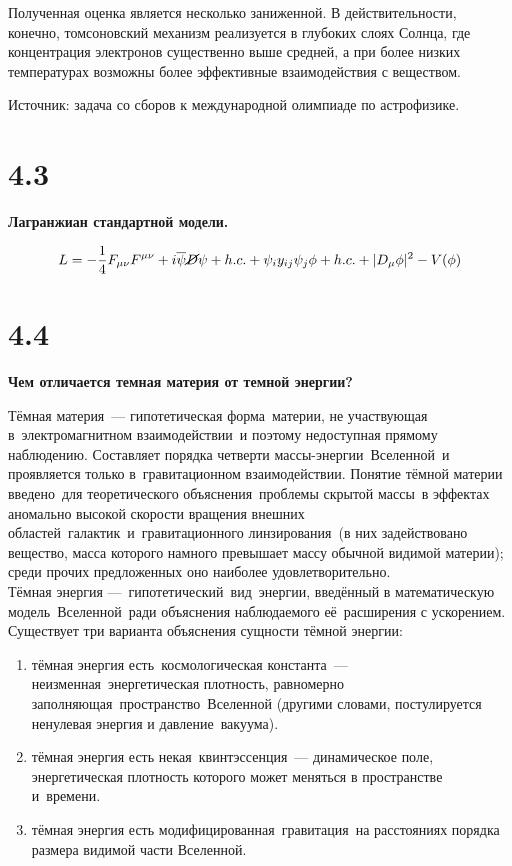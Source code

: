 \documentclass[a4paper,14pt]{article}
\begin{document}
Полученная оценка является несколько заниженной. В действительности, конечно, томсоновский механизм реализуется в глубоких слоях Солнца, где концентрация электронов существенно выше средней, а при более низких температурах возможны более эффективные взаимодействия с веществом.

Источник: задача со сборов к международной олимпиаде по астрофизике.

\section*{4.3}

\begin{center}
	\LARGE{\textbf{Лагранжиан стандартной модели.}}\\
\end{center}

\begin{equation*}
L = -\frac{1}{4} F_{\mu \nu} F^{\mu \nu} + i \overline{\psi} \cancel D \psi + h.c. + \psi_{i} y_{ij} \psi_{j} \phi + h.c. + |D_{\mu} \phi |^2 - V(\phi )
\end{equation*}

\section*{4.4}

\begin{center}
	\LARGE{\textbf{Чем отличается темная материя от темной энергии?}}\\
\end{center}

Тёмная материя — гипотетическая форма материи, не участвующая в электромагнитном взаимодействии и поэтому недоступная прямому наблюдению. Составляет порядка четверти массы-энергии Вселенной и проявляется только в гравитационном взаимодействии. Понятие тёмной материи введено для теоретического объяснения проблемы скрытой массы в эффектах аномально высокой скорости вращения внешних областей галактик и гравитационного линзирования (в них задействовано вещество, масса которого намного превышает массу обычной видимой материи); среди прочих предложенных оно наиболее удовлетворительно.\\

Тёмная энергия — гипотетический вид энергии, введённый в математическую модель Вселенной ради объяснения наблюдаемого её расширения с ускорением.
Существует три варианта объяснения сущности тёмной энергии:
\begin{enumerate}
	\item тёмная энергия есть космологическая константа — неизменная энергетическая плотность, равномерно заполняющая пространство Вселенной (другими словами, постулируется ненулевая энергия и давление вакуума).
	\item тёмная энергия есть некая квинтэссенция — динамическое поле, энергетическая плотность которого может меняться в пространстве и времени.
	\item тёмная энергия есть модифицированная гравитация на расстояниях порядка размера видимой части Вселенной.
\end{enumerate}
\end{document}
